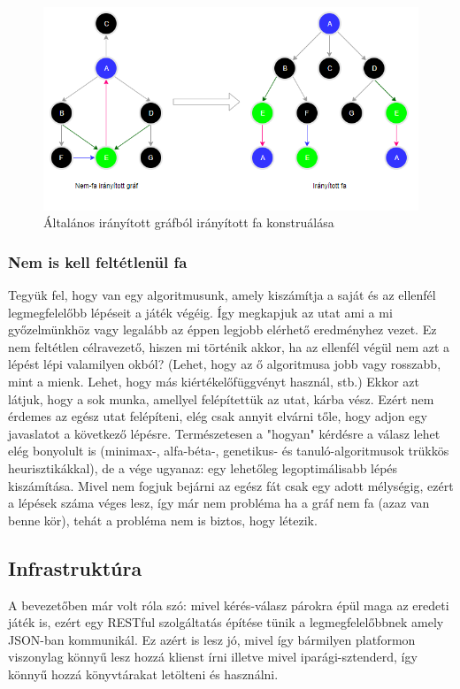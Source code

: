 \documentclass[twoside, a4paper, 12pt]{article}
\begin{document}
\begin{figure}[htbp]
	\centering
	\includegraphics[width=1.0\textwidth]{img/game-graph-transformation.png}
	\caption{Általános irányított gráfból irányított fa konstruálása}
	\label{fig:game-graph-transformation}
\end{figure}

\subsubsection{Nem is kell feltétlenül fa}
Tegyük fel, hogy van egy algoritmusunk, amely kiszámítja a saját és az ellenfél legmegfelelőbb lépéseit a játék végéig. Így megkapjuk az utat ami a mi győzelmünkhöz vagy legalább az éppen legjobb elérhető eredményhez vezet. Ez nem feltétlen célravezető, hiszen mi történik akkor, ha az ellenfél végül nem azt a lépést lépi valamilyen okból? (Lehet, hogy az ő algoritmusa jobb vagy rosszabb, mint a mienk. Lehet, hogy más kiértékelőfüggvényt használ, stb.) Ekkor azt látjuk, hogy a sok munka, amellyel felépítettük az utat, kárba vész. Ezért nem érdemes az egész utat felépíteni, elég csak annyit elvárni tőle, hogy adjon egy javaslatot a következő lépésre. Természetesen a "hogyan" kérdésre a válasz lehet elég bonyolult is (minimax-, alfa-béta-, genetikus- és tanuló-algoritmusok trükkös heurisztikákkal), de a vége ugyanaz: egy lehetőleg legoptimálisabb lépés kiszámítása. Mivel nem fogjuk bejárni az egész fát csak egy adott mélységig, ezért a lépések száma véges lesz, így már nem probléma ha a gráf nem fa (azaz van benne kör), tehát a probléma nem is biztos, hogy létezik.

\subsection{Infrastruktúra}
A bevezetőben már volt róla szó: mivel kérés-válasz párokra épül maga az eredeti játék is, ezért egy RESTful szolgáltatás építése tünik a legmegfelelőbbnek amely JSON-ban kommunikál. Ez azért is lesz jó, mivel így bármilyen platformon viszonylag könnyű lesz hozzá klienst írni illetve mivel iparági-sztenderd, így könnyű hozzá könyvtárakat letölteni és használni.
\end{document}
